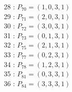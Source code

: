 \documentclass{article}
\begin{document}
{\begin{multicols}{3}
28 : $P_{70}=( 1, 0, 3, 1 )$\\
29 : $P_{71}=( 2, 0, 3, 1 )$\\
30 : $P_{72}=( 3, 0, 3, 1 )$\\
31 : $P_{73}=( 0, 1, 3, 1 )$\\
32 : $P_{75}=( 2, 1, 3, 1 )$\\
33 : $P_{77}=( 0, 2, 3, 1 )$\\
34 : $P_{78}=( 1, 2, 3, 1 )$\\
35 : $P_{81}=( 0, 3, 3, 1 )$\\
36 : $P_{84}=( 3, 3, 3, 1 )$\\
\end{multicols}


%


%


}%
\end{document}

